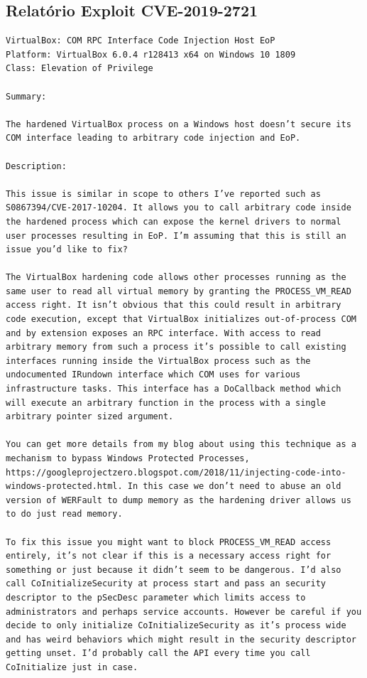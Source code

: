 \documentclass[11t]{article}
\begin{document}
\clearpage



\subsection*{Relatório Exploit CVE-2019-2721}

\begin{lstlisting}[breaklines=true]
VirtualBox: COM RPC Interface Code Injection Host EoP
Platform: VirtualBox 6.0.4 r128413 x64 on Windows 10 1809
Class: Elevation of Privilege

Summary: 

The hardened VirtualBox process on a Windows host doesn’t secure its COM interface leading to arbitrary code injection and EoP.

Description:

This issue is similar in scope to others I’ve reported such as S0867394/CVE-2017-10204. It allows you to call arbitrary code inside the hardened process which can expose the kernel drivers to normal user processes resulting in EoP. I’m assuming that this is still an issue you’d like to fix?

The VirtualBox hardening code allows other processes running as the same user to read all virtual memory by granting the PROCESS_VM_READ access right. It isn’t obvious that this could result in arbitrary code execution, except that VirtualBox initializes out-of-process COM and by extension exposes an RPC interface. With access to read arbitrary memory from such a process it’s possible to call existing interfaces running inside the VirtualBox process such as the undocumented IRundown interface which COM uses for various infrastructure tasks. This interface has a DoCallback method which will execute an arbitrary function in the process with a single arbitrary pointer sized argument.

You can get more details from my blog about using this technique as a mechanism to bypass Windows Protected Processes, https://googleprojectzero.blogspot.com/2018/11/injecting-code-into-windows-protected.html. In this case we don’t need to abuse an old version of WERFault to dump memory as the hardening driver allows us to do just read memory.

To fix this issue you might want to block PROCESS_VM_READ access entirely, it’s not clear if this is a necessary access right for something or just because it didn’t seem to be dangerous. I’d also call CoInitializeSecurity at process start and pass an security descriptor to the pSecDesc parameter which limits access to administrators and perhaps service accounts. However be careful if you decide to only initialize CoInitializeSecurity as it’s process wide and has weird behaviors which might result in the security descriptor getting unset. I’d probably call the API every time you call CoInitialize just in case.


\end{lstlisting}
\end{document}
